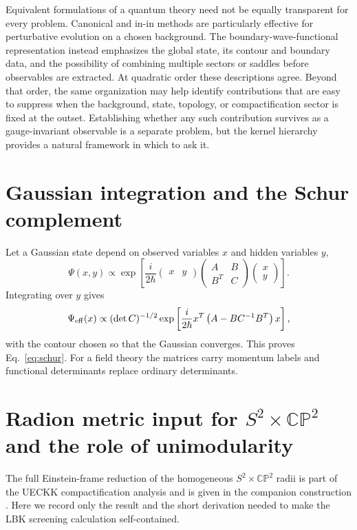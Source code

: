 \documentclass[aps,prd,twocolumn,superscriptaddress,nofootinbib,longbibliography]{revtex4-2}
\newcommand{\CP}{\mathbb{CP}}
\begin{document}
Equivalent formulations of a quantum theory need not be equally transparent for every problem. Canonical and in-in methods are particularly effective for perturbative evolution on a chosen background. The boundary-wave-functional representation instead emphasizes the global state, its contour and boundary data, and the possibility of combining multiple sectors or saddles before observables are extracted. At quadratic order these descriptions agree. Beyond that order, the same organization may help identify contributions that are easy to suppress when the background, state, topology, or compactification sector is fixed at the outset. Establishing whether any such contribution survives as a gauge-invariant observable is a separate problem, but the kernel hierarchy provides a natural framework in which to ask it.

\appendix
\section{Gaussian integration and the Schur complement}
Let a Gaussian state depend on observed variables $x$ and hidden variables $y$,
\begin{equation}
\Psi(x,y)\propto\exp\left[\frac{i}{2\hbar}
\begin{pmatrix}x&y\end{pmatrix}
\begin{pmatrix}A&B\\B^T&C\end{pmatrix}
\begin{pmatrix}x\\y\end{pmatrix}\right].
\end{equation}
Integrating over $y$ gives
\begin{equation}
\Psi_{\rm eff}(x)\propto
(\det C)^{-1/2}\exp\left[\frac{i}{2\hbar}x^T
\left(A-BC^{-1}B^T\right)x\right],
\end{equation}
with the contour chosen so that the Gaussian converges. This proves Eq.~\eqref{eq:schur}. For a field theory the matrices carry momentum labels and functional determinants replace ordinary determinants.




\section{Radion metric input for $S^2\times\CP^2$ and the role of unimodularity}
\label{app:unimodularG}
The full Einstein-frame reduction of the homogeneous $S^2\times\CP^2$ radii is part of the UECKK compactification analysis and is given in the companion construction \cite{ShayaUECKK2026}. Here we record only the result and the short derivation needed to make the LBK screening calculation self-contained.
\end{document}
